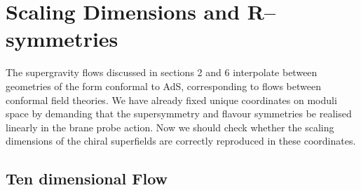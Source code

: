 \documentclass[a4paper,12pt]{article}
\begin{document}
\section{Scaling Dimensions and R--symmetries}
\label{scaling}


The supergravity flows discussed in sections 2 and 6 interpolate
between geometries of the form conformal to AdS\coordHE{},
corresponding to flows between conformal field theories. We have
already fixed unique coordinates on moduli space by demanding that the
supersymmetry and flavour symmetries be realised linearly in the brane
probe action. Now we should check whether the scaling dimensions of
the chiral superfields are correctly reproduced in these coordinates.

\subsection{Ten dimensional \coordHE{} Flow}
\label{scaling-10d}
\end{document}
